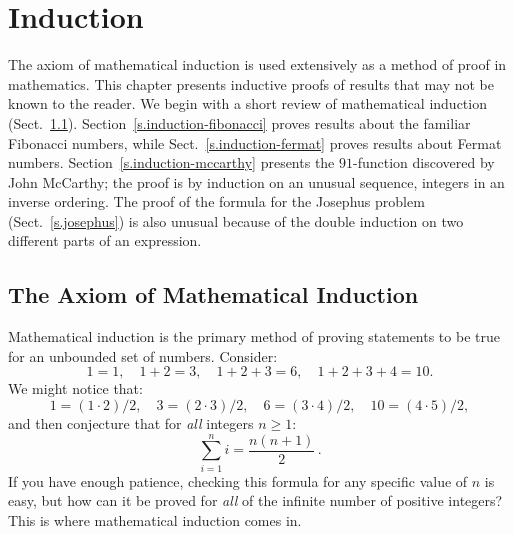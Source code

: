 
\chapter{Induction}\label{c.induction}




The axiom of mathematical induction is used extensively as a method of proof in mathematics. This chapter presents inductive proofs of results that may not be known to the reader. We begin with a short review of mathematical induction (Sect.~\ref{s.induction-axiom}). Section~\ref{s.induction-fibonacci} proves results about the familiar Fibonacci numbers, while Sect.~\ref{s.induction-fermat} proves results about Fermat numbers. Section~\ref{s.induction-mccarthy} presents the $91$-function discovered by John McCarthy; the proof is by induction on an unusual sequence, integers in an inverse ordering. The proof of the formula for the Josephus problem (Sect.~\ref{s.josephus}) is also unusual because of the double induction on two different parts of an expression.

\section{The Axiom of Mathematical Induction}\label{s.induction-axiom}

Mathematical induction is the primary method of proving statements to be true for an unbounded set of numbers. Consider:
\[
1=1,\quad 1+2=3,\quad 1+2+3=6,\quad 1+2+3+4=10.
\]
We might notice that:
\[
1=(1\cdot 2)/2,\quad 3=(2\cdot 3)/2,\quad  6=(3\cdot 4)/2,\quad 10=(4\cdot 5)/2,
\]
and then conjecture that for \emph{all} integers $n\geq 1$:
\[
\sum_{i=1}^n i = \frac{n(n+1)}{2}\,.
\]
If you have enough patience, checking this formula for any specific value of $n$ is easy, but how can it be proved for \emph{all} of the infinite number of positive integers? This is where mathematical induction comes in.

